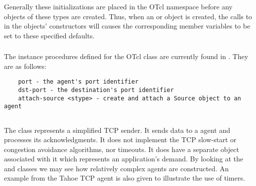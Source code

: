 Generally these initializations are placed in the OTcl namespace
before any objects of these types are created.
Thus, when an  or  object
is created, the calls to 
in the objects' constructors will causes the corresponding member variables
to be set to these specified defaults.

\subsubsection{}

The instance procedures defined for the OTcl  class are
currently found in .
They are as follows:
\begin{small}
\begin{verbatim}
	port - the agent's port identifier
	dst-port - the destination's port identifier
	attach-source <stype> - create and attach a Source object to an agent
\end{verbatim}
\end{small}

\subsection{}

The class  represents a simplified TCP sender.
It sends data to a  agent and processes its acknowledgments.
It does not implement the TCP slow-start or congestion avoidance
algorithms, nor timeouts.
It does have a separate object associated with it which represents
an application's demand.
By looking at the  and  classes
we may see how relatively complex agents are constructed.
An example from the Tahoe TCP agent  is also given
to illustrate the use of timers.

\subsubsection{}

